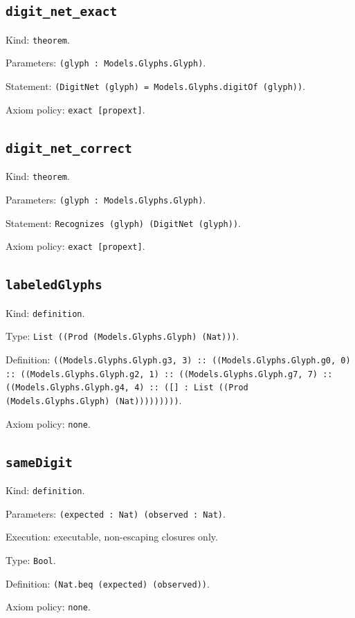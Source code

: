 \documentclass[11pt]{article}
\begin{document}
\subsection*{\texttt{digit\_net\_exact}}
\noindent Kind: \texttt{theorem}.\par
\noindent Parameters: \texttt{(glyph : Models.Glyphs.Glyph)}.\par
\noindent Statement: \texttt{(DigitNet (glyph) = Models.Glyphs.digitOf (glyph))}.\par
\noindent Axiom policy: \texttt{exact [propext]}.\par
\subsection*{\texttt{digit\_net\_correct}}
\noindent Kind: \texttt{theorem}.\par
\noindent Parameters: \texttt{(glyph : Models.Glyphs.Glyph)}.\par
\noindent Statement: \texttt{Recognizes (glyph) (DigitNet (glyph))}.\par
\noindent Axiom policy: \texttt{exact [propext]}.\par
\subsection*{\texttt{labeledGlyphs}}
\noindent Kind: \texttt{definition}.\par
\noindent Type: \texttt{List ((Prod (Models.Glyphs.Glyph) (Nat)))}.\par
\noindent Definition: \texttt{((Models.Glyphs.Glyph.g3, 3) :: ((Models.Glyphs.Glyph.g0, 0) :: ((Models.Glyphs.Glyph.g2, 1) :: ((Models.Glyphs.Glyph.g7, 7) :: ((Models.Glyphs.Glyph.g4, 4) :: ([] : List ((Prod (Models.Glyphs.Glyph) (Nat)))))))))}.\par
\noindent Axiom policy: \texttt{none}.\par
\subsection*{\texttt{sameDigit}}
\noindent Kind: \texttt{definition}.\par
\noindent Parameters: \texttt{(expected : Nat) (observed : Nat)}.\par
\noindent Execution: executable, non-escaping closures only.\par
\noindent Type: \texttt{Bool}.\par
\noindent Definition: \texttt{(Nat.beq (expected) (observed))}.\par
\noindent Axiom policy: \texttt{none}.\par
\end{document}
